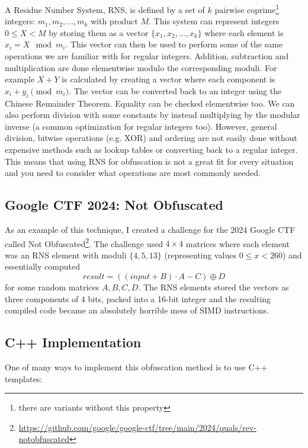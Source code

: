 \documentclass[twocolumn]{article}
\begin{document}
A Residue Number System, RNS, is defined by a set of $k$ pairwise coprime\footnote{there are variants without this property} integers: $m_1, m_2, \ldots, m_k$ with product $M$. This system can represent integers $0 \leq X < M$ by storing them as a vector $\{x_1, x_2, \ldots, x_k\}$ where each element is $x_i = X \mod{m_i}$. This vector can then be used to perform some of the same operations we are familiar with for regular integers. Addition, subtraction and multiplication are done elementwise modulo the corresponding moduli. For example $X + Y$ is calculated by creating a vector where each component is $x_i + y_i \pmod{m_i}$. The vector can be converted back to an integer using the Chinese Remainder Theorem. Equality can be checked elementwise too. We can also perform division with some constants by instead multiplying by the modular inverse (a common optimization for regular integers too). However, general division, bitwise operations (e.g. XOR) and ordering are not easily done without expensive methods such as lookup tables or converting back to a regular integer. This means that using RNS for obfuscation is not a great fit for every situation and you need to consider what operations are most commonly needed.

\vspace*{-0.5\baselineskip}
\subsection*{Google CTF 2024: Not Obfuscated}

As an example of this technique, I created a challenge for the 2024 Google CTF called Not Obfuscated\footnote{\url{https://github.com/google/google-ctf/tree/main/2024/quals/rev-notobfuscated}}. The challenge used $4 \times 4$ matrices where each element was an RNS element with moduli $\{4, 5, 13\}$ (representing values $0 \leq x < 260$) and essentially computed \[\mathit{result} = ((\mathit{input} + B) \cdot A - C) \oplus D\] for some random matrices $A, B, C, D$. The RNS elements stored the vectors as three components of 4 bits, packed into a 16-bit integer and the resulting compiled code became an absolutely horrible mess of SIMD instructions.

\vspace*{-0.5\baselineskip}
\subsection*{C++ Implementation}

One of many ways to implement this obfuscation method is to use C++ templates:
\end{document}
